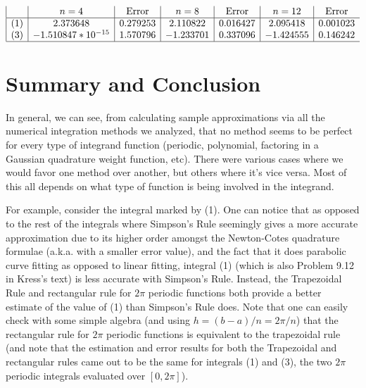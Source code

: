 \documentclass[a4paper,draft]{amsproc}
\theoremstyle{plain}
\theoremstyle{definition}
\theoremstyle{remark}
\numberwithin{equation}{section}
\begin{document}
\begin{displaymath}
\begin{array}{|c|c|c|c|c|c|c}

 & n=4
 & \text{Error}
 & n=8
 & \text{Error}
 & n=12
 & \text{Error} \\
\hline
(1) & 2.373648 & 0.279253 & 2.110822 & 0.016427 & 2.095418 & 0.001023 \\
(3) & -1.510847*10^{-15} & 1.570796 & -1.233701 & 0.337096 & -1.424555 & 0.146242 \\
\hline
\end{array}
\end{displaymath}

\section{Summary and Conclusion}

In general, we can see, from calculating sample approximations via all the numerical integration methods we analyzed, that no method seems to be perfect for every type of integrand function (periodic, polynomial,  factoring in a Gaussian quadrature weight function, etc). There were various cases where we would favor one method over another, but others where it's vice versa. Most of this all depends on what type of function is being involved in the integrand.

For example, consider the integral marked by (1). One can notice that as opposed to the rest of the integrals where Simpson's Rule seemingly gives a more accurate approximation due to its higher order amongst the Newton-Cotes quadrature formulae (a.k.a. with a smaller error value), and the fact that it does parabolic curve fitting as opposed to linear fitting, integral (1) (which is also Problem 9.12 in Kress's text) is less accurate with Simpson's Rule. Instead, the Trapezoidal Rule and rectangular rule for $2\pi$ periodic functions both provide a better estimate of the value of (1) than Simpson's Rule does. Note that one can easily check with some simple algebra (and using $h=(b-a)/n=2\pi/n$) that the rectangular rule for $2\pi$ periodic functions is equivalent to the trapezoidal rule (and note that the estimation and error results for both the Trapezoidal and rectangular rules came out to be the same for integrals (1) and (3), the two $2\pi$ periodic integrals evaluated over $[0, 2\pi]$). 
\end{document}
